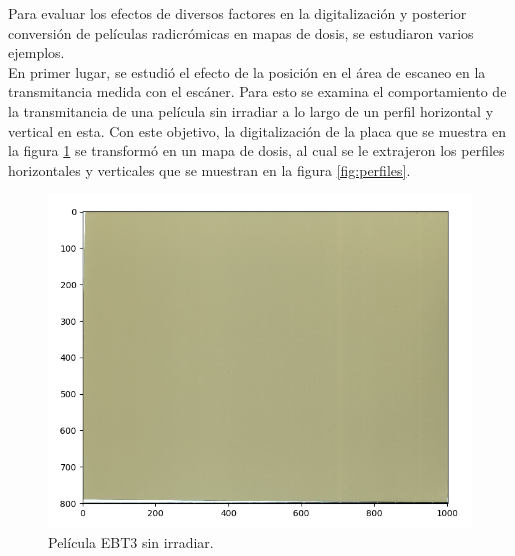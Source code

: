 Para evaluar los efectos de diversos factores en la digitalización y posterior conversión de películas radicrómicas en mapas de dosis, se estudiaron varios ejemplos. \\

En primer lugar, se estudió el efecto de la posición en el área de escaneo en la transmitancia medida con el escáner. Para esto se examina el comportamiento de la transmitancia de una película sin irradiar a lo largo de un perfil horizontal y vertical en esta. Con este objetivo, la digitalización de la placa que se muestra en la figura \ref{fig:fondoCero} se transformó en un mapa de dosis, al cual se le extrajeron los perfiles horizontales y verticales que se muestran en la figura \ref{fig:perfiles}.\\

\begin{figure}[H]
	\centering
	\includegraphics[width=0.7\linewidth]{images/imagenFondoCero.png}
	\caption{Película EBT3 sin irradiar. }
	\label{fig:fondoCero}
\end{figure}

